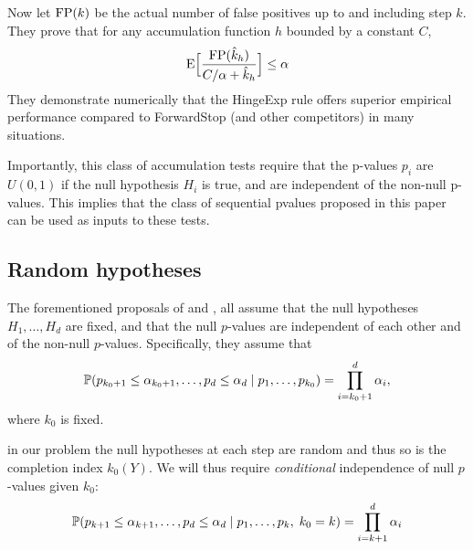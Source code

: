 \documentclass{article}
\begin{document}
Now let ${\rm FP}(k)$ be the actual number of false positives up to and including step $k$.
They prove that for any  accumulation function $h$ bounded by a constant $C$,
\begin{equation}
{\rm E} \Bigl[ \frac{{\rm FP}(\hat k_h)}{C/\alpha+\hat k_h} \Bigr] \leq \alpha
\end{equation}
They demonstrate numerically that the HingeExp rule offers superior empirical performance compared to ForwardStop  (and other competitors) in many situations.

Importantly, this class of accumulation tests require that  the p-values $p_i$  are  $U(0,1)$ if the null hypothesis $H_i$ is true, and are independent of the non-null p-values.
This implies that the class of sequential pvalues proposed in this paper can be used as inputs to these tests.

\subsection{Random hypotheses}
The forementioned proposals of  \citet{gsell2013sequential} and \citet{li2015accumulation}, all assume that the null hypotheses $H_{1}, \ldots, H_{d}$ are fixed, and that the null $p$-values are independent of each other and of the non-null $p$-values. Specifically, they assume that
\begin{equation}\label{eq:indepCond_fixed_k0}
\P(p_{k_0+1} \leq \alpha_{k_0+1}, \ldots, p_d \leq \alpha_d
\mid p_1, \ldots, p_{k_0}) = \prod_{i=k_0+1}^d \alpha_i,
\end{equation}
where $k_0$ is fixed. 

in our problem the null hypotheses at each step are random and thus so is the completion index $k_0(Y)$.     We will thus require {\em conditional} independence of null $p$-values given $k_0$:
\begin{equation}\label{eq:indepCond_random_k0}
  \P(p_{k+1} \leq \alpha_{k+1}, \ldots, p_d \leq \alpha_d
  \mid p_1, \ldots, p_k, \; k_0 = k) = \prod_{i=k+1}^d \alpha_i
\end{equation}
\end{document}
